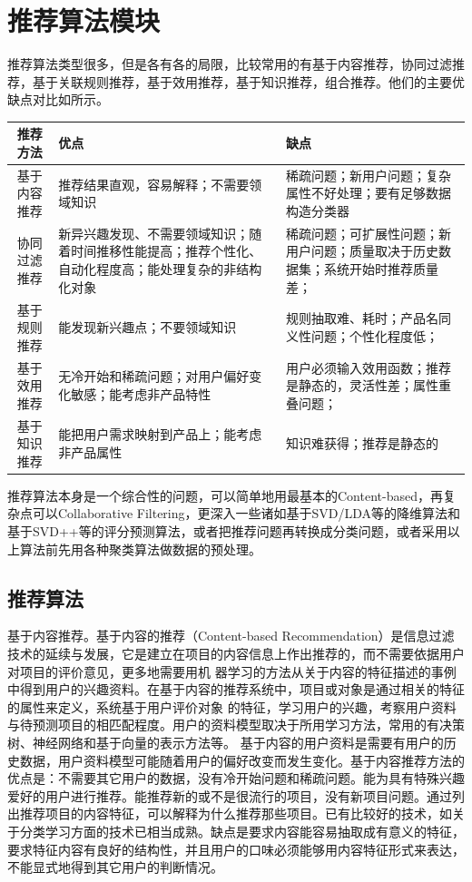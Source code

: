   \section{推荐算法模块}
  推荐算法类型很多，但是各有各的局限，比较常用的有基于内容推荐，协同过滤推荐，基于关联规则推荐，基于效用推荐，基于知识推荐，组合推荐。他们的主要优缺点对比如所示。
  \begin{table}[htp]
  \centering
  \label{tab:algarithm}
  \begin{tabular}{ |c|p{6cm}|p{6cm}| } \hline
   推荐方法 & 优点 & 缺点 \\ \hline
   基于内容推荐 & 推荐结果直观，容易解释；不需要领域知识 & 稀疏问题；新用户问题；复杂属性不好处理；要有足够数据构造分类器 \\ \hline
   协同过滤推荐 & 新异兴趣发现、不需要领域知识；随着时间推移性能提高；推荐个性化、自动化程度高；能处理复杂的非结构化对象 & 稀疏问题；可扩展性问题；新用户问题；质量取决于历史数据集；系统开始时推荐质量差； \\ \hline
   基于规则推荐 & 能发现新兴趣点；不要领域知识 & 规则抽取难、耗时；产品名同义性问题；个性化程度低； \\ \hline
   基于效用推荐 & 无冷开始和稀疏问题；对用户偏好变化敏感；能考虑非产品特性 & 用户必须输入效用函数；推荐是静态的，灵活性差；属性重叠问题； \\ \hline
   基于知识推荐 & 能把用户需求映射到产品上；能考虑非产品属性 & 知识难获得；推荐是静态的\\ \hline
  \end{tabular}
  \end{table}
  推荐算法本身是一个综合性的问题，可以简单地用最基本的Content-based，再复杂点可以Collaborative Filtering，更深入一些诸如基于SVD/LDA等的降维算法和基于SVD++等的评分预测算法，或者把推荐问题再转换成分类问题，或者采用以上算法前先用各种聚类算法做数据的预处理。
    
    \subsection{推荐算法}
    基于内容推荐。基于内容的推荐（Content-based Recommendation）是信息过滤技术的延续与发展，它是建立在项目的内容信息上作出推荐的，而不需要依据用户对项目的评价意见，更多地需要用机 器学习的方法从关于内容的特征描述的事例中得到用户的兴趣资料。在基于内容的推荐系统中，项目或对象是通过相关的特征的属性来定义，系统基于用户评价对象 的特征，学习用户的兴趣，考察用户资料与待预测项目的相匹配程度。用户的资料模型取决于所用学习方法，常用的有决策树、神经网络和基于向量的表示方法等。 基于内容的用户资料是需要有用户的历史数据，用户资料模型可能随着用户的偏好改变而发生变化。基于内容推荐方法的优点是：不需要其它用户的数据，没有冷开始问题和稀疏问题。能为具有特殊兴趣爱好的用户进行推荐。能推荐新的或不是很流行的项目，没有新项目问题。通过列出推荐项目的内容特征，可以解释为什么推荐那些项目。已有比较好的技术，如关于分类学习方面的技术已相当成熟。缺点是要求内容能容易抽取成有意义的特征，要求特征内容有良好的结构性，并且用户的口味必须能够用内容特征形式来表达，不能显式地得到其它用户的判断情况。

